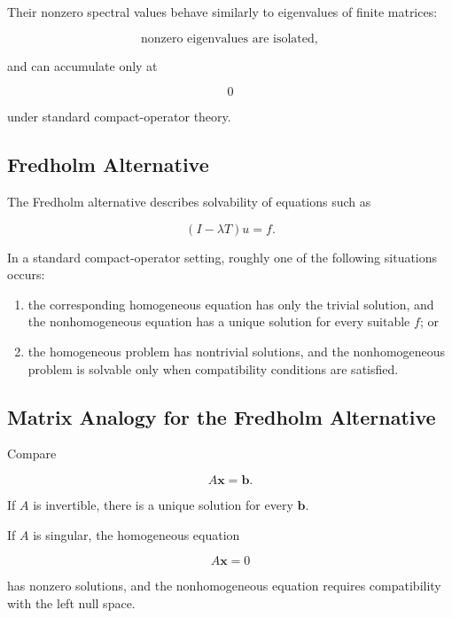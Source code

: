 Their nonzero spectral values behave similarly to eigenvalues of finite
matrices:

\[
\boxed{
\text{nonzero eigenvalues are isolated},
}
\]

and can accumulate only at

\[
\boxed{
0
}
\]

under standard compact-operator theory.

\subsection{Fredholm Alternative}
\label{subsec:fredholm-alternative}

The Fredholm alternative describes solvability of equations such as

\[
\boxed{
(I-\lambda T)u=f.
}
\]

In a standard compact-operator setting, roughly one of the following
situations occurs:

\begin{enumerate}
    \item the corresponding homogeneous equation has only the trivial
          solution, and the nonhomogeneous equation has a unique
          solution for every suitable \(f\); or
    \item the homogeneous problem has nontrivial solutions, and the
          nonhomogeneous problem is solvable only when compatibility
          conditions are satisfied.
\end{enumerate}

\subsection{Matrix Analogy for the Fredholm Alternative}
\label{subsec:fredholm-matrix-analogy}

Compare

\[
\boxed{
A\mathbf{x}=\mathbf{b}.
}
\]

If \(A\) is invertible, there is a unique solution for every
\(\mathbf{b}\).

If \(A\) is singular, the homogeneous equation

\[
A\mathbf{x}=0
\]

has nonzero solutions, and the nonhomogeneous equation requires
compatibility with the left null space.

